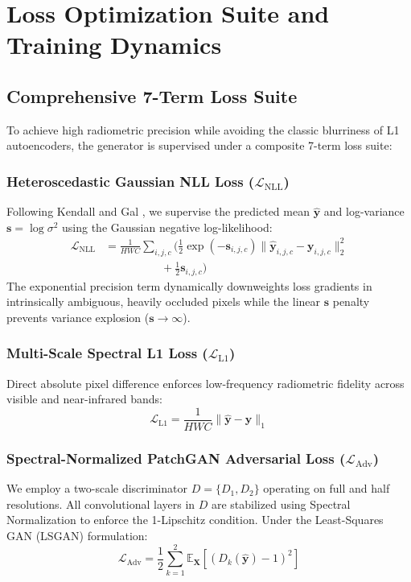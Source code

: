 \section{Loss Optimization Suite and Training Dynamics}
\label{sec:experiments}

\subsection{Comprehensive 7-Term Loss Suite}
To achieve high radiometric precision while avoiding the classic blurriness of L1 autoencoders, the generator is supervised under a composite 7-term loss suite:

\subsubsection{Heteroscedastic Gaussian NLL Loss ($\mathcal{L}_{\text{NLL}}$)}
Following Kendall and Gal \cite{kendall2017what}, we supervise the predicted mean $\hat{\mathbf{y}}$ and log-variance $\mathbf{s} = \log \sigma^2$ using the Gaussian negative log-likelihood:
\begin{align}
    \mathcal{L}_{\text{NLL}} &= \frac{1}{HWC} \sum_{i,j,c} \Big( \frac{1}{2}\exp(-\mathbf{s}_{i,j,c}) \|\hat{\mathbf{y}}_{i,j,c} - \mathbf{y}_{i,j,c}\|_2^2 \nonumber \\
    &\qquad\qquad\quad + \frac{1}{2}\mathbf{s}_{i,j,c} \Big)
\end{align}
The exponential precision term dynamically downweights loss gradients in intrinsically ambiguous, heavily occluded pixels while the linear $\mathbf{s}$ penalty prevents variance explosion ($\mathbf{s} \to \infty$).

\subsubsection{Multi-Scale Spectral L1 Loss ($\mathcal{L}_{\text{L1}}$)}
Direct absolute pixel difference enforces low-frequency radiometric fidelity across visible and near-infrared bands:
\begin{equation}
    \mathcal{L}_{\text{L1}} = \frac{1}{HWC} \|\hat{\mathbf{y}} - \mathbf{y}\|_1
\end{equation}

\subsubsection{Spectral-Normalized PatchGAN Adversarial Loss ($\mathcal{L}_{\text{Adv}}$)}
We employ a two-scale discriminator $D = \{D_1, D_2\}$ operating on full and half resolutions. All convolutional layers in $D$ are stabilized using Spectral Normalization \cite{miyato2018spectral} to enforce the 1-Lipschitz condition. Under the Least-Squares GAN (LSGAN) formulation:
\begin{equation}
    \mathcal{L}_{\text{Adv}} = \frac{1}{2} \sum_{k=1}^2 \mathbb{E}_{\mathbf{X}}\left[ (D_k(\hat{\mathbf{y}}) - 1)^2 \right]
\end{equation}

